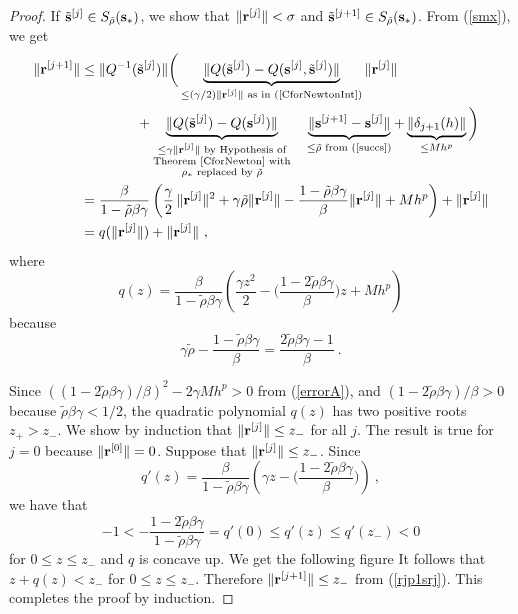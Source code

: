 \begin{proof}
 If $\tilde{\mathbf{s}}^{[j]} \in S_{\tilde{\rho}}(\mathbf{s}_\ast)$,
we show that
$\| \mathbf{r}^{[j]} \| < \sigma$ and
$\tilde{\mathbf{s}}^{[j+1]} \in S_{\tilde{\rho}}(\mathbf{s}_\ast)$.
From (\ref{smx}), we get
\begin{align}
\| \mathbf{r}^{[j+1]} \| & \leq
\| Q^{-1}(\tilde{\mathbf{s}}^{[j]}) \|
\bigg( \underbrace{\| Q(\tilde{\mathbf{s}}^{[j]}) -
Q(\mathbf{s}^{[j]},\tilde{\mathbf{s}}^{[j]}) \|}_{\leq 
(\gamma/2) \| \mathbf{r}^{[j]}\| \text{ as in (\ref{CforNewtonInt})}}
\| \mathbf{r}^{[j]} \| \nonumber \\
& \qquad \qquad +
\underbrace{\| Q(\tilde{\mathbf{s}}^{[j]}) -Q(\mathbf{s}^{[j]}) \|}_{
\substack{\leq \gamma \| \mathbf{r}^{[j]}\| \text{ by Hypothesis of}\\
\text{Theorem~\ref{CforNewton} with}\\
\text{$\rho_\ast$ replaced by $\tilde{\rho}$}}}
\quad \underbrace{\| \mathbf{s}^{[j+1]} - \mathbf{s}^{[j]} \|}_{\leq
\tilde{\rho} \text{ from (\ref{succs})}}
+ \underbrace{\| \delta_{j+1}(h) \|}_{\leq Mh^p} \bigg)\nonumber \\
& = \frac{\beta}{1-\tilde{\rho}\beta\gamma} \left
( \frac{\gamma}{2}\,\| \mathbf{r}^{[j]}\|^2 + \gamma \tilde{\rho} \|
\mathbf{r}^{[j]} \| - \frac{1-\tilde{\rho}\beta\gamma}{\beta} \| \mathbf{r}^{[j]} \|
+ Mh^p \right) + \| \mathbf{r}^{[j]} \| \nonumber \\
&= q(\| \mathbf{r}^{[j]} \|) + \| \mathbf{r}^{[j]} \| \ ,  \label{rjp1srj}
\end{align}
where
\[
q(z) = \frac{\beta}{1-\tilde{\rho}\beta\gamma}
\left( \frac{\gamma z^2}{2} - \big
( \frac{1-2\tilde{\rho}\beta\gamma}{\beta} \big) z + Mh^p \right)
\]
because
\[
  \gamma\tilde{\rho} - \frac{1-\tilde{\rho} \beta\gamma}{\beta}
  = \frac{2\tilde{\rho}\beta\gamma -1}{\beta} \ .
\]

Since $((1-2\tilde{\rho}\beta\gamma)/\beta)^2 - 2\gamma Mh^p > 0$
from (\ref{errorA}), and $(1-2\tilde{\rho}\beta\gamma)/\beta > 0$ because
$\tilde{\rho}\beta\gamma < 1/2$,  the quadratic polynomial $q(z)$ has two
positive roots $z_+ > z_-$.
We show by induction that $\| \mathbf{r}^{[j]} \| \leq z_-$
for all $j$.  The result is true for $j=0$ because
$\| \mathbf{r}^{[0]} \| = 0$.  Suppose that
$\| \mathbf{r}^{[j]}\| \leq z_-$.  Since
\[
  q'(z) = \frac{\beta}{1-\tilde{\rho}\beta\gamma} \left(
\gamma z - \big( \frac{1-2\tilde{\rho}\beta\gamma}{\beta} \big)
\right) \ ,
\]
we have that
\[
-1 < -\frac{1-2\tilde{\rho}\beta\gamma}{1-\tilde{\rho}\beta\gamma}
= q'(0) \leq q'(z) \leq q'(z_-) < 0
\]
for $0 \leq z \leq z_-$ and $q$ is concave up.  We get the following
figure
It follows that $z + q(z) < z_-$ for $0 \leq
z \leq z_-$.  Therefore $\| \mathbf{r}^{[j+1]} \| \leq z_-$ from
(\ref{rjp1srj}).  This completes the proof by induction.


\end{proof}
